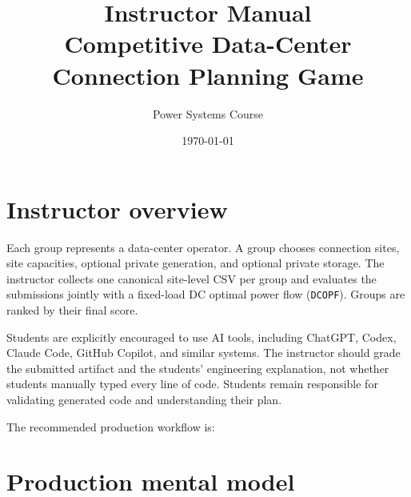 \documentclass[12pt]{article}
\title{\textbf{Instructor Manual}\\[0.4em]
  \large Competitive Data-Center Connection Planning Game}
\author{Power Systems Course}
\date{\today}
\newcommand{\code}[1]{\texttt{#1}}
\begin{document}
\maketitle

\begin{center}
\end{center}
\tableofcontents
\newpage

\section{Instructor overview}

Each group represents a data-center operator. A group chooses connection sites,
site capacities, optional private generation, and optional private storage. The
instructor collects one canonical site-level CSV per group and evaluates the
submissions jointly with a fixed-load DC optimal power flow (\code{DCOPF}).
Groups are ranked by their final score.

Students are explicitly encouraged to use AI tools, including ChatGPT, Codex,
Claude Code, GitHub Copilot, and similar systems. The instructor should grade
the submitted artifact and the students' engineering explanation, not whether
students manually typed every line of code. Students remain responsible for
validating generated code and understanding their plan.

The recommended production workflow is:
\begin{center}
\end{center}

\section{Production mental model}
\end{document}
